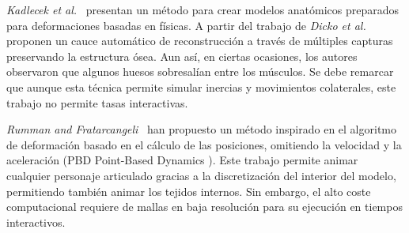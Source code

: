 \emph{Kadlecek et al.}~\cite{kadlecek-16-reconstructing} presentan un método para crear modelos anatómicos preparados para deformaciones basadas en físicas. A partir del trabajo de \emph{Dicko et al.}\cite{Ali2013} proponen un cauce automático de reconstrucción a través de múltiples capturas preservando la estructura ósea. Aun así, en ciertas ocasiones, los autores observaron que algunos huesos sobresalían entre los músculos. Se debe remarcar que aunque esta técnica permite simular inercias y movimientos colaterales, este trabajo no permite tasas interactivas.   %

\emph{Rumman and Fratarcangeli}~\cite{abu2015position} han propuesto un método inspirado en el algoritmo de deformación basado en el cálculo de las posiciones, omitiendo la velocidad y la aceleración (PBD Point-Based Dynamics \cite{Bender:2014}). Este trabajo permite animar cualquier personaje articulado gracias a la discretización del interior del modelo, permitiendo también animar los tejidos internos. Sin embargo, el alto coste computacional requiere de mallas en baja resolución para su ejecución en tiempos interactivos.

